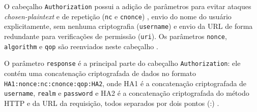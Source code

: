\documentclass[12pt]{article}
\begin{document}
O cabeçalho \texttt{Authorization} possui a adição de parâmetros para evitar ataques 
\emph{chosen-plaintext} e de repetição (\texttt{nc} e \texttt{cnonce}) \cite{RFC7616}, envio do 
nome do usuário explicitamente, sem nenhuma criptografia (\texttt{username}) e envio da URL de 
forma redundante para verificações de permissão (\texttt{uri}). Os parâmetros \texttt{nonce}, 
\texttt{algorithm} e \texttt{qop} são reenviados neste cabeçalho \cite{CHAPMAN2012}.





O parâmetro \texttt{response} é a principal parte do cabeçalho \texttt{Authorization}: ele contém 
uma concatenação criptografada de dados no formato \texttt{HA1:nonce:nc:cnonce:qop:HA2}, onde HA1 é 
a concatenação criptografada de \texttt{username}, \texttt{realm} e \texttt{password} e HA2 é a 
concatenação criptografada do método HTTP e da URL da requisição, todos separados por dois pontos 
(:) \cite{CHAPMAN2012}.
\end{document}
